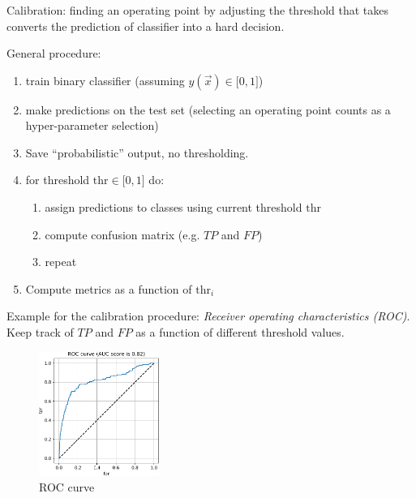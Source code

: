 \begin{frame}\frametitle{\subsubsecname}

Calibration: finding an operating point by adjusting the threshold that takes converts the prediction of classifier into a hard decision.

General procedure:
\begin{enumerate}
\item train binary classifier (assuming $y(\vec x) \in \lbrack0,1\rbrack$)
\item make predictions on the test set (selecting an operating point counts as a hyper-parameter selection)
\item Save ``probabilistic'' output, no thresholding.
\item for threshold $\mathrm{thr} \in \lbrack0,1\rbrack$ do:
\begin{enumerate}
	\item assign predictions to classes using current threshold $\mathrm{thr}$
	\item compute confusion matrix (e.g. $TP$ and $FP$)
	\item[]repeat
\end{enumerate}
\item Compute metrics as a function of $\mathrm{thr}_i$
\end{enumerate}



\end{frame}

\begin{frame}
Example for the calibration procedure: \emph{Receiver operating characteristics (ROC)}. Keep track of $TP$ and $FP$ as a function of different threshold values.

\begin{figure}[h]
	\includegraphics[width=0.35\textwidth]{img/curves_roc}
	\caption{ROC curve}
\end{figure}


\end{frame}

